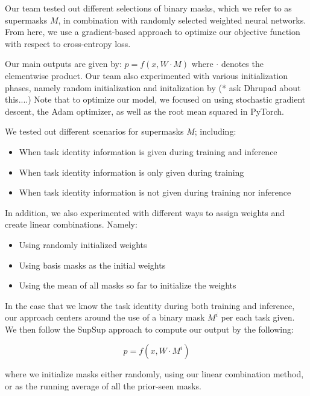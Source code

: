 \documentclass{article}
\begin{document}
Our team tested out different selections of binary masks, which we refer to as supermasks $M$, in combination with randomly selected weighted neural networks. From here, we use a gradient-based approach to optimize our objective function with respect to cross-entropy loss. 

Our main outputs are given by: $p = f(x, W \cdotp M)$ where $\cdotp$ denotes the elementwise product. Our team also experimented with various initialization phases, namely random initialization and initalization by (* ask Dhrupad about this....) Note that to optimize our model, we focused on using stochastic gradient descent, the Adam optimizer, as well as the root mean squared in PyTorch.

We tested out different scenarios for supermasks $M$; including:
    \begin{itemize}[noitemsep]
        \item When task identity information is given during training and inference
        \item When task identity information is only given during training
        \item When task identity information is not given during training nor inference 
    \end{itemize}

In addition, we also experimented with different ways to assign weights and create linear combinations. Namely: 

    \begin{itemize}[noitemsep]
        \item Using randomly initialized weights
        \item Using basis masks as the initial weights 
        \item Using the mean of all masks so far to initialize the weights
    \end{itemize}

In the case that we know the task identity during both training and inference, our approach centers around the use of a binary mask $M^i$ per each task given. We then follow the SupSup approach to compute our output by the following: 

$$ p = f(x, W \cdot M^i)$$

where we initialize masks either randomly, using our linear combination method, or as the running average of all the prior-seen masks.
\end{document}

